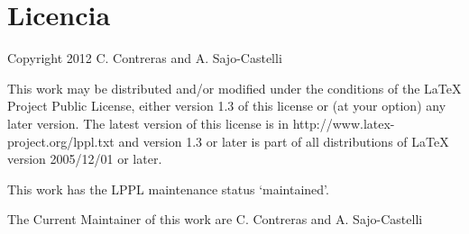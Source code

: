 \chapter{Licencia}
Copyright 2012 C. Contreras and A. Sajo-Castelli
  
  This work may be distributed and/or modified under the
  conditions of the LaTeX Project Public License, either version 1.3
  of this license or (at your option) any later version.
  The latest version of this license is in
    http://www.latex-project.org/lppl.txt
  and version 1.3 or later is part of all distributions of LaTeX
  version 2005/12/01 or later.
  
  This work has the LPPL maintenance status `maintained'.
  
  The Current Maintainer of this work are C. Contreras and A. Sajo-Castelli
